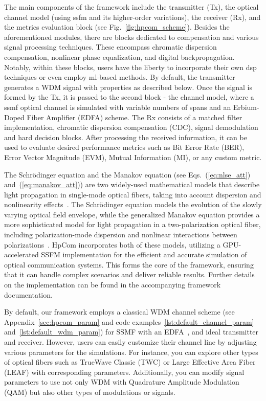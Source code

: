 The main components of the framework include the transmitter (Tx), the optical channel model (using \Gls{ssfm} and its higher-order variations), the receiver (Rx), and the metrics evaluation block (see Fig.~\ref{fig:hpcom_scheme}). Besides the aforementioned modules, there are blocks dedicated to compensation and various signal processing techniques. These encompass chromatic dispersion compensation, nonlinear phase equalization, and digital backpropagation. Notably, within these blocks, users have the liberty to incorporate their own \Gls{dsp} techniques or even employ \Gls{ml}-based methods. By default, the transmitter generates a WDM signal with properties as described below. Once the signal is formed by the Tx, it is passed to the second block - the channel model, where a \gls{ssmf} optical channel is simulated with variable numbers of spans and an Erbium-Doped Fiber Amplifier (EDFA) scheme. The Rx consists of a matched filter implementation, chromatic dispersion compensation (CDC), signal demodulation and hard decision blocks. After processing the received information, it can be used to evaluate desired performance metrics such as Bit Error Rate (BER), Error Vector Magnitude (EVM), Mutual Information (MI), or any custom metric.

The Schr\"odinger equation and the Manakov equation (see Eqs.~(\ref{eq:nlse_att}) and~(\ref{eq:manakov_att})) are two widely-used mathematical models that describe light propagation in single-mode optical fibers, taking into account dispersion and nonlinearity effects~\cite{agrawal2000nonlinear}. The Schr\"odinger equation models the evolution of the slowly varying optical field envelope, while the generalized Manakov equation provides a more sophisticated model for light propagation in a two-polarization optical fiber, including polarization-mode dispersion and nonlinear interactions between polarizations~\cite{poletti2008description, mumtaz2012nonlinear}.
HpCom incorporates both of these models, utilizing a GPU-accelerated SSFM implementation for the efficient and accurate simulation of optical communication systems. This forms the core of the framework, ensuring that it can handle complex scenarios and deliver reliable results. Further details on the implementation can be found in the accompanying framework documentation\cite{esf0_2023_7880552}.

By default, our framework employs a classical WDM channel scheme (see Appendix~\ref{sec:hpcom_param} and code examples~\ref{lst:default_channel_param} and~\ref{lst:default_wdm_param}) for SSMF with an EDFA~\cite{essiambre2010capacity}, and ideal transmitter and receiver. However, users can easily customize their channel line by adjusting various parameters for the simulations. For instance, you can explore other types of optical fibers such as TrueWave Classic\cite{taylor2002application} (TWC) or Large Effective Area Fiber\cite{charlet200972} (LEAF) with corresponding parameters. Additionally, you can modify signal parameters to use not only WDM with Quadrature Amplitude Modulation (QAM) but also other types of modulations or signals.


